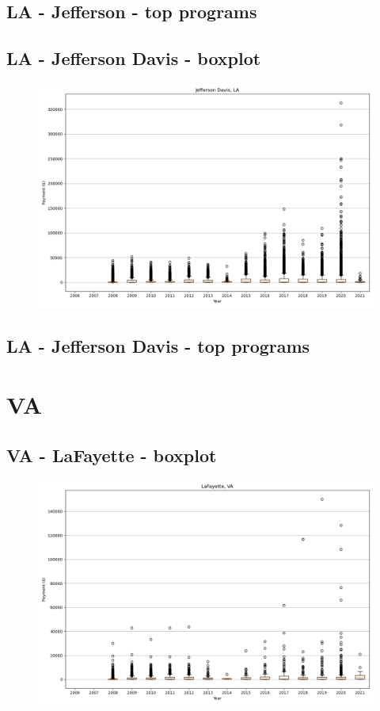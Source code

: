 \subsection*{LA - Jefferson - top programs}

\newpage
\subsection*{LA - Jefferson Davis - boxplot}
\begin{figure}[h]
\centering
\includegraphics[width=7in]{../output/boxplots/counties/Jefferson Davis-LA_boxplot.png}
\end{figure}


\subsection*{LA - Jefferson Davis - top programs}

\newpage
\section*{VA}
\subsection*{VA - LaFayette - boxplot}
\begin{figure}[h]
\centering
\includegraphics[width=7in]{../output/boxplots/counties/LaFayette-VA_boxplot.png}
\end{figure}


